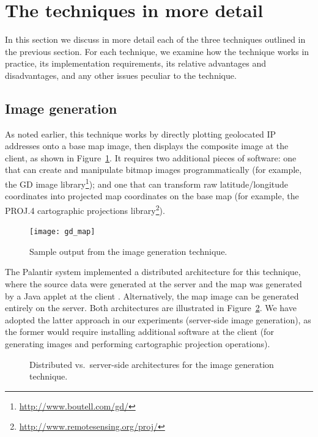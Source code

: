 \documentclass[acmtocl,acmnow]{acmtrans2m}
\begin{document}
\section{The techniques in more detail}
\label{sec-techniques}

In this section we discuss in more detail each of the three techniques
outlined in the previous section. For each technique, we examine how the
technique works in practice, its implementation requirements, its
relative advantages and disadvantages, and any other issues peculiar
to the technique.


\subsection{Image generation}
\label{sec-imagegen}

As noted earlier, this technique works by directly plotting geolocated
IP addresses onto a base map image, then displays the composite image at
the client, as shown in Figure~\ref{fig-image}. It requires two
additional pieces of software: one that can create and manipulate bitmap
images programmatically (for example, the GD image
library\footnote{\url{http://www.boutell.com/gd/}}); and one that can
transform raw latitude/longitude coordinates into projected map
coordinates on the base map (for example, the PROJ.4 cartographic
projections library\footnote{\url{http://www.remotesensing.org/proj/}}).


\begin{figure}
	\begin{center}
		\texttt{[image: gd\_map]}
	\end{center}
	\caption{Sample output from the image generation technique.}
	\label{fig-image}
\end{figure}


The Palantir system implemented a distributed architecture for this
technique, where the source data were generated at the server and the
map was generated by a Java applet at the client
\cite{Papa-N-1998-Palantir}. Alternatively, the map image can be
generated entirely on the server. Both architectures are illustrated in
Figure~\ref{fig-image-architecture}. We have adopted the latter approach
in our experiments (server-side image generation), as the former would
require installing additional software at the client (for generating
images and performing cartographic projection operations).


\begin{figure}
	\caption{Distributed vs.\ server-side architectures for the image
	generation technique.}
	\label{fig-image-architecture}
\end{figure}
\end{document}
